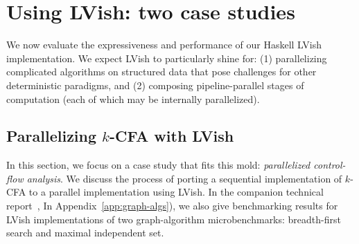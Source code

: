 \section{Using LVish: two case studies}\label{section:lvish-evaluation}


We now evaluate 
the expressiveness and performance of our Haskell LVish implementation.
We expect LVish to particularly shine for:
  (1) parallelizing complicated algorithms on structured data that pose 
    challenges for other deterministic paradigms, and 
  (2) composing pipeline-parallel stages of computation 
     (each of which may be internally parallelized).

\subsection{Parallelizing $k$-CFA with LVish}\label{subsection:lvish-k-cfa}

In this section, we focus on a case study that fits this mold:
\emph{parallelized control-flow analysis}.  We discuss the process of
porting a sequential implementation of $k$-CFA to a parallel
implementation using LVish.
\ifx\fulltr\undefined
In the companion technical
report~\cite{Freeze-TR}, 
\else
In Appendix~\ref{app:graph-algs}),
\fi
we also give benchmarking results for LVish
implementations of two graph-algorithm microbenchmarks: breadth-first
search and maximal independent set.






